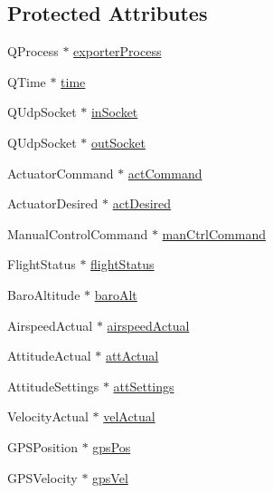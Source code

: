 \subsection*{\-Protected \-Attributes}
\begin{DoxyCompactItemize}
\item 
\-Q\-Process $\ast$ \hyperlink{group___mo_cap_plugin_ga3e0f59d7efdaba4ae56afc474e929a17}{exporter\-Process}
\item 
\-Q\-Time $\ast$ \hyperlink{group___mo_cap_plugin_gac71372aac301b0f6d2ae67c3a5c4be63}{time}
\item 
\-Q\-Udp\-Socket $\ast$ \hyperlink{group___mo_cap_plugin_ga01c0037d3abe6f3cfc9521e865cbe65f}{in\-Socket}
\item 
\-Q\-Udp\-Socket $\ast$ \hyperlink{group___mo_cap_plugin_gad4adc615f73413f479e48983cce6f3e0}{out\-Socket}
\item 
\-Actuator\-Command $\ast$ \hyperlink{group___mo_cap_plugin_gaaa8cd64f3935d77113b41cf84f398e78}{act\-Command}
\item 
\-Actuator\-Desired $\ast$ \hyperlink{group___mo_cap_plugin_ga480be6f8874e252461095878c7b41d08}{act\-Desired}
\item 
\-Manual\-Control\-Command $\ast$ \hyperlink{group___mo_cap_plugin_ga8855725831e82f6e02e0caba72c0dd7b}{man\-Ctrl\-Command}
\item 
\-Flight\-Status $\ast$ \hyperlink{group___mo_cap_plugin_ga63bef489a0fb9ccf02eadc577d487c10}{flight\-Status}
\item 
\-Baro\-Altitude $\ast$ \hyperlink{group___mo_cap_plugin_ga15711fcb53727148f4c62b5bfa1ce9f1}{baro\-Alt}
\item 
\-Airspeed\-Actual $\ast$ \hyperlink{group___mo_cap_plugin_ga933ba2309643df8ddd342ae4cf010fca}{airspeed\-Actual}
\item 
\-Attitude\-Actual $\ast$ \hyperlink{group___mo_cap_plugin_gaa96960187d095cbbc69ba0cc08d776a7}{att\-Actual}
\item 
\-Attitude\-Settings $\ast$ \hyperlink{group___mo_cap_plugin_gaa7be67cf3fe5bd561bfd56b81ace46d6}{att\-Settings}
\item 
\-Velocity\-Actual $\ast$ \hyperlink{group___mo_cap_plugin_gaf7dc7b4cb9c561edf9c8df28131eeac3}{vel\-Actual}
\item 
\-G\-P\-S\-Position $\ast$ \hyperlink{group___mo_cap_plugin_gab8839ee3d842d22d5717905f7dea20cd}{gps\-Pos}
\item 
\-G\-P\-S\-Velocity $\ast$ \hyperlink{group___mo_cap_plugin_ga75de3c84f1e0fec7aec493cb1a27b9a8}{gps\-Vel}
\item 

\end{DoxyCompactItemize}
